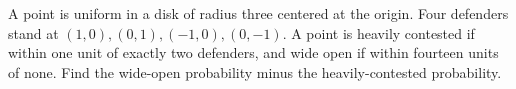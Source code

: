A point is uniform in a disk of radius three centered at the origin. Four defenders stand at $(1,0),(0,1),(-1,0),(0,-1)$. A point is heavily contested if within one unit of exactly two defenders, and wide open if within fourteen units of none. Find the wide-open probability minus the heavily-contested probability.
